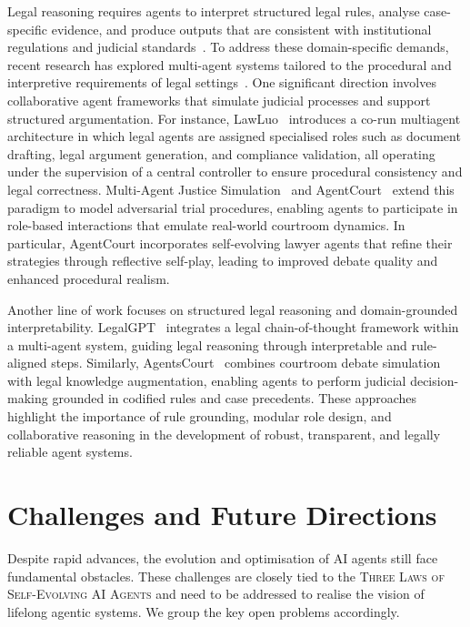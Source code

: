 \documentclass[]{selfevolagent}
\theoremstyle{plain}
\theoremstyle{definition}
\theoremstyle{remark}
\newcommand{\ThreeLaws}{{\scshape\color{selfevolagent_dark!120} Three Laws of Self-Evolving AI Agents}}
\begin{document}
Legal reasoning requires agents to interpret structured legal rules, analyse case-specific evidence, and produce outputs that are consistent with institutional regulations and judicial standards~\citep{xu2023multi,yuan2024can,jiang2025agentsbench}. To address these domain-specific demands, recent research has explored multi-agent systems tailored to the procedural and interpretive requirements of legal settings~\citep{di2023multi,hu2023language,chen2024agentcourt}. One significant direction involves collaborative agent frameworks that simulate judicial processes and support structured argumentation. For instance, LawLuo~\citep{sun2024lawluo} introduces a co-run multiagent architecture in which legal agents are assigned specialised roles such as document drafting, legal argument generation, and compliance validation, all operating under the supervision of a central controller to ensure procedural consistency and legal correctness. Multi-Agent Justice Simulation~\citep{di2023multi} and AgentCourt~\citep{chen2024agentcourt} extend this paradigm to model adversarial trial procedures, enabling agents to participate in role-based interactions that emulate real-world courtroom dynamics. In particular, AgentCourt incorporates self-evolving lawyer agents that refine their strategies through reflective self-play, leading to improved debate quality and enhanced procedural realism.

Another line of work focuses on structured legal reasoning and domain-grounded interpretability. LegalGPT~\citep{shi2024legalgpt} integrates a legal chain-of-thought framework within a multi-agent system, guiding legal reasoning through interpretable and rule-aligned steps. Similarly, AgentsCourt~\citep{he2024agentscourt} combines courtroom debate simulation with legal knowledge augmentation, enabling agents to perform judicial decision-making grounded in codified rules and case precedents. These approaches highlight the importance of rule grounding, modular role design, and collaborative reasoning in the development of robust, transparent, and legally reliable agent systems.



\section{Challenges and Future Directions}
\label{sec:challenges_and_directions}

Despite rapid advances, the evolution and optimisation of AI agents still face fundamental obstacles. These challenges are closely tied to the \ThreeLaws{} and need to be addressed to realise the vision of lifelong agentic systems. We group the key open problems accordingly.
\end{document}
